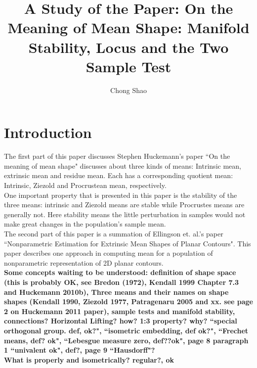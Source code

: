 \documentclass[12pt]{article}
\theoremstyle{definition}
\theoremstyle{remark}
\numberwithin{equation}{section}
\begin{document}
\title{
A Study of the Paper: On the Meaning of Mean Shape: Manifold Stability, Locus and the Two Sample Test}%
\author{Chong Shao}%

\maketitle
\section{Introduction}
The first part of this paper discusses Stephen Huckemann's paper ``On the meaning of mean shape" discusses about three kinds of means: Intrinsic mean, extrinsic mean and residue mean. Each has a corresponding quotient mean: Intrinsic, Ziezold and Procrustean mean, respectively. \\[0.2cm]
One important property that is presented in this paper is the stability of the three means: intrinsic and Ziezold means are stable while Procrustes means are generally not. Here stability means the little perturbation in samples would not make great changes in the population's sample mean. \\[0.2cm]
The second part of this paper is a summation of Ellingson et. al.'s paper ``Nonparametric Estimation for Extrinsic Mean Shapes of Planar Contours". This paper describes one approach in computing mean for a population of nonparametric representation of 2D planar contours.\\[0.2cm]
\textbf{Some concepts waiting to be understood: definition of shape space (this is probably OK, see Bredon (1972), Kendall 1999 Chapter 7.3 and Huckemann 2010b), Three means and their names on shape shapes (Kendall 1990, Ziezold 1977, Patragenaru 2005 and xx. see page 2 on Huckemann 2011 paper), sample tests and manifold stability, connections? Horizontal Lifting? how? 1:3 property? why? ``special orthogonal group. def, ok?", ``isometric embedding, def ok?", ``Frechet means, def? ok", ``Lebesgue measure zero, def??ok", page 8 paragraph 1 ``univalent ok", def?, page 9 ``Hausdorff"? \\ What is properly and isometrically? regular?, ok}
\end{document}

